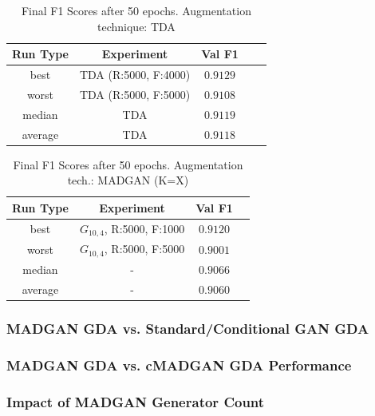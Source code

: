 \begin{table}[H]
	\centering
	\vspace{-1.5em}
	\begin{tabular}{|c|c|c|c|c|}
		\hline
		Run Type & Experiment & Val F1 \\ \hline
		best & TDA (R:5000, F:4000) & $0.9129$\\ \hline
		worst & TDA (R:5000, F:5000) & $0.9108$\\ \hline
		median & TDA & $0.9119$\\ \hline
		average & TDA & $0.9118$
		\\ \hline
	\end{tabular}
    \caption{Final F1 Scores after 50 epochs. Augmentation technique: TDA}
        \label{tab:res_expansion_fashion_tda_vs_madgan__tda}
\end{table}
\begin{table}[H]
	\vspace{-1.5em}
	\centering
	\begin{tabular}{|c|c|c|c|}
		\hline
		Run Type & Experiment & Val F1 \\ \hline
		best & \(G_{10, 4}\), R:5000, F:1000 & $0.9120$\\ \hline
		worst & \(G_{10, 4}\), R:5000, F:5000 & $0.9001$\\ \hline
		median & - & $0.9066$\\ \hline
		average & - & $0.9060$
		\\ \hline
	\end{tabular}
    \caption{Final F1 Scores after 50 epochs. Augmentation tech.: MADGAN (K=X)}
        \label{tab:res_expansion_fashion_tda_vs_madgan__madgan}
\end{table}



\subsubsection[Question 3]{MADGAN GDA vs. Standard/Conditional GAN GDA} \label{exp_results_ans_q3} 
 
\subsubsection[Question 4]{MADGAN GDA vs. cMADGAN GDA Performance}      \label{exp_results_ans_q4} 
 

\subsubsection[Question 5]{Impact of MADGAN Generator Count}            \label{exp_results_ans_q5} 
 


\newpage
